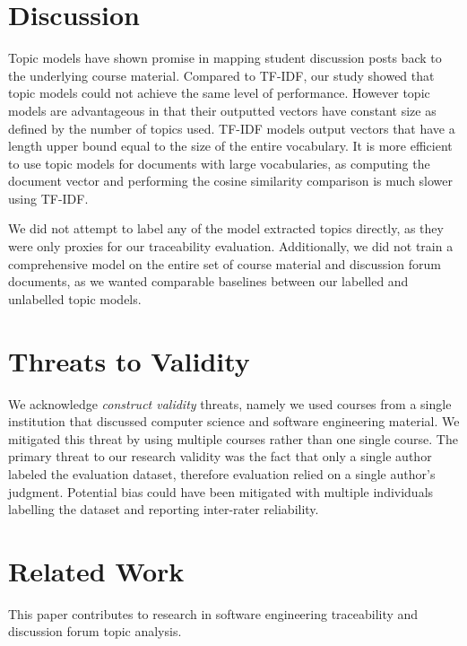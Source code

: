 \documentclass[sigconf, nonacm=true]{acmart}
\begin{document}
\section{Discussion}
Topic models have shown promise in mapping student discussion posts back to the underlying course material.
Compared to TF-IDF, our study showed that topic models could not achieve the same level of performance.
However topic models are advantageous in that their outputted vectors have constant size as defined by the number of topics used.
TF-IDF models output vectors that have a length upper bound equal to the size of the entire vocabulary.
It is more efficient to use topic models for documents with large vocabularies, as computing the document vector and performing the cosine similarity comparison is much slower using TF-IDF.

We did not attempt to label any of the model extracted topics directly, as they were only proxies for our traceability evaluation.
Additionally, we did not train a comprehensive model on the entire set of course material and discussion forum documents, as we wanted comparable baselines between our labelled and unlabelled topic models.

\section{Threats to Validity}
We acknowledge \textit{construct validity} threats, namely we used courses from a single institution that discussed computer science and software engineering material. We mitigated this threat by using multiple courses rather than one single course.
The primary threat to our research validity was the fact that only a single author labeled the evaluation dataset, therefore evaluation relied on a single author's judgment.
Potential bias could have been mitigated with multiple individuals labelling the dataset and reporting inter-rater reliability.

\section{Related Work}
This paper contributes to research in software engineering traceability and discussion forum topic analysis.
\end{document}
